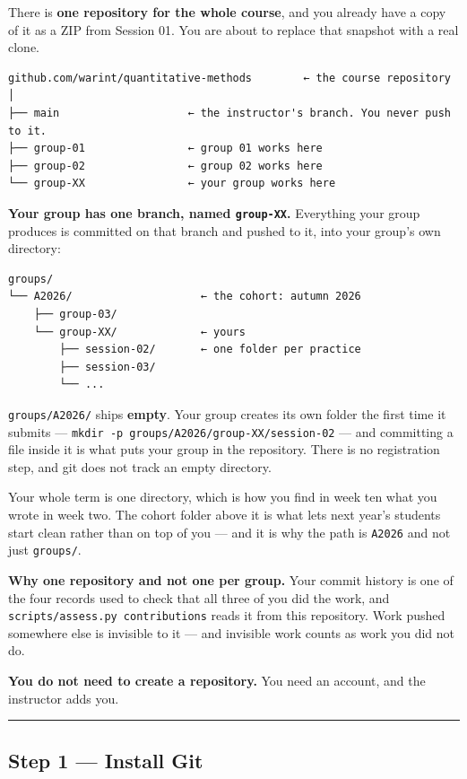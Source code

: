 \documentclass[
  letterpaper,
  10pt,
  twoside,
  openright,
  numbers=noenddot,
  chapterprefix=true]{scrbook}
\begin{document}
There is \textbf{one repository for the whole course}, and you already
have a copy of it as a ZIP from Session 01. You are about to replace
that snapshot with a real clone.

\begin{verbatim}
github.com/warint/quantitative-methods        ← the course repository
│
├── main                    ← the instructor's branch. You never push to it.
├── group-01                ← group 01 works here
├── group-02                ← group 02 works here
└── group-XX                ← your group works here
\end{verbatim}

\textbf{Your group has one branch, named \texttt{group-XX}.} Everything
your group produces is committed on that branch and pushed to it, into
your group's own directory:

\begin{verbatim}
groups/
└── A2026/                    ← the cohort: autumn 2026
    ├── group-03/
    └── group-XX/             ← yours
        ├── session-02/       ← one folder per practice
        ├── session-03/
        └── ...
\end{verbatim}

\texttt{groups/A2026/} ships \textbf{empty}. Your group creates its own
folder the first time it submits ---
\texttt{mkdir\ -p\ groups/A2026/group-XX/session-02} --- and committing
a file inside it is what puts your group in the repository. There is no
registration step, and git does not track an empty directory.

Your whole term is one directory, which is how you find in week ten what
you wrote in week two. The cohort folder above it is what lets next
year's students start clean rather than on top of you --- and it is why
the path is \texttt{A2026} and not just \texttt{groups/}.

\textbf{Why one repository and not one per group.} Your commit history
is one of the four records used to check that all three of you did the
work, and \texttt{scripts/assess.py\ contributions} reads it from this
repository. Work pushed somewhere else is invisible to it --- and
invisible work counts as work you did not do.

\textbf{You do not need to create a repository.} You need an account,
and the instructor adds you.

\begin{center}\rule{0.5\linewidth}{0.5pt}\end{center}

\subsection{Step 1 --- Install Git}\label{step-1-install-git}
\end{document}
